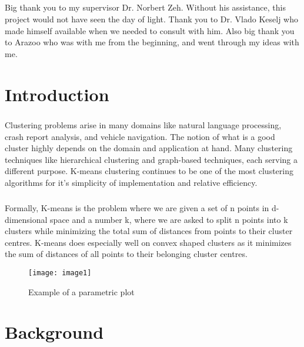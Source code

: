 \documentclass[12pt]{dalthesis}
\begin{document}
\begin{acknowledgements}
  \paragraph{}
  Big thank you to my supervisor Dr. Norbert Zeh. Without his assistance, this project would not have seen the day of light. Thank you to Dr. Vlado Keselj who made himself available when we needed to consult with him. Also big thank you to Arazoo who was with me from the beginning, and went through my ideas with me.
\end{acknowledgements}

\mainmatter


\chapter{Introduction}
\paragraph{}
Clustering problems arise in many domains like
natural language processing\cite{ravichandran2005randomized},
crash report analysis\cite{soto2016machine}, 
and vehicle navigation\cite{maio1996dynamic}.
The notion of what is a good cluster highly depends on the domain and application at hand. Many clustering techniques like hierarchical clustering\cite{corpet1988multiple}
and graph-based techniques\cite{schaeffer2007graph}, each serving a different purpose. K-means clustering continues to be one of the most clustering algorithms for it's simplicity of implementation and relative efficiency\cite{jain2010data}.
\paragraph{}
Formally, K-means is the problem where we are given a set of n points in d-dimensional space and a number k, where we are asked to split n points into k clusters while minimizing the total sum of distances from points to their cluster centres. K-means does especially well on convex shaped clusters as it minimizes the sum of distances of all points to their belonging cluster centres.

\begin{figure}[h]
\centering
\texttt{[image: image1]}
\caption{Example of a parametric plot }
\end{figure}


\chapter{Background}
\end{document}
